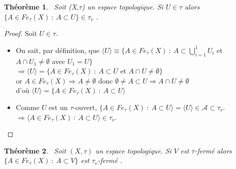 \documentclass[11pt]{report}
\newenvironment{boxtheorem}
{\begin{tcolorbox}
		[enhanced jigsaw,breakable,pad at break*=2mm,
		colback=black!5,colframe=bleueLeger]}
	{\end{tcolorbox}}
\theoremstyle{styletheorem}
\newtheorem{theoreme}{Théorème}[section]
\newenvironment{theorem}
{\vspace*{0.3cm}\begin{boxtheorem}\begin{theoreme}}{\end{theoreme}\end{boxtheorem}\vspace*{0.3cm}}
\theoremstyle{styledef}
\theoremstyle{remark}
\begin{document}
\begin{theorem}\ \label{propr1} 
	Soit (X,$\tau$) un espace topologique. Si $ U\in \tau $ alors $ \lbrace A \in Fe_{\tau}(X) \ : \ A \subset U \rbrace \in \tau_{v}$ \cite{b7}.
\end{theorem}
\begin{proof}
	Soit $U \in \tau $. 
	\begin{itemize}
		\item  On sait, par définition, que $\langle U \rangle \equiv \lbrace  A \in Fe_{\tau}(X) \ : \ A \subset \bigcup_{i=1}^1 U_i $ et $A \cap U_1 \neq \emptyset $ avec $U_1 = U \rbrace$ \\
		$\Rightarrow  \langle U \rangle = \lbrace  A \in Fe_{\tau}(X) \ : \ A \subset U$ et $A \cap U \neq \emptyset \rbrace$\\
		or $A \in Fe_\tau(X)  \Rightarrow A \neq \emptyset $ donc $\emptyset \neq A \subset U \Rightarrow A \cap U \neq \emptyset$\\ d'où $\langle U \rangle = \lbrace  A \in Fe_{\tau}(X) \ : \ A \subset U \rangle$
		\item Comme $U$ est un $\tau$-ouvert,  $\lbrace  A \in Fe_{\tau}(X) \ : \ A \subset U \rangle = \langle U \rangle \in \mathcal{A} \subset \tau_v$.\\ 
		$\Rightarrow \langle  A \in Fe_{\tau}(X) \ : \ A \subset U \rangle \in \tau_v$.
	\end{itemize}
\end{proof}
\begin{theorem} \  \label{propr2}
	Soit $(X,\tau)$ un espace topologique. Si $ V$ est $\tau $-fermé alors $ \lbrace A \in Fe_{\tau}(X) \ : \ A \subset V \rbrace$ est  $\tau_{v}$-fermé \cite{b7}. 
\end{theorem}
\end{document}
